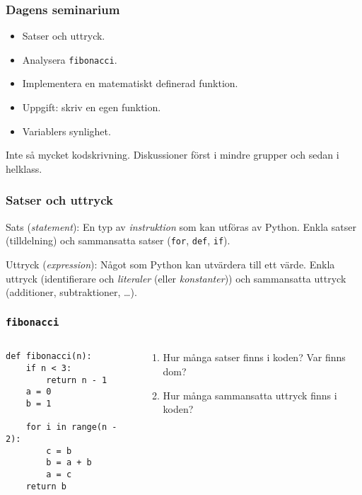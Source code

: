 \documentclass{beamer}
\begin{document}
  \begin{frame}
    \frametitle{Dagens seminarium}

    \begin{itemize}
      \item Satser och uttryck.
      \item Analysera \texttt{fibonacci}.
      \item Implementera en matematiskt definerad funktion.
      \item Uppgift: skriv en egen funktion.
      \item Variablers synlighet.
    \end{itemize}

    Inte så mycket kodskrivning. Diskussioner först i mindre grupper och sedan i
    helklass.

  \end{frame}

  \begin{frame}
    \frametitle{Satser och uttryck}

    Sats (\textit{statement}): En typ av \emph{instruktion} som kan utföras av
    Python. Enkla satser (tilldelning) och sammansatta satser (\texttt{for},
    \texttt{def}, \texttt{if}).

    Uttryck (\textit{expression}): Något som Python kan utvärdera till ett
    värde. Enkla uttryck (identifierare och \textit{literaler} (eller
    \textit{konstanter})) och sammansatta uttryck (additioner, subtraktioner,
    \dots).

  \end{frame}

  \begin{frame}[fragile]
    \frametitle{\texttt{fibonacci}}

    \begin{columns}
      \begin{column}{0.48\textwidth}
        \begin{verbatim}
def fibonacci(n):
    if n < 3:
        return n - 1
    a = 0
    b = 1

    for i in range(n - 2):
        c = b
        b = a + b
        a = c
    return b
        \end{verbatim}
      \end{column}%
      \begin{column}{0.48\textwidth}
        \begin{enumerate}
          \item Hur många satser finns i koden? Var finns dom?
          \item Hur många sammansatta uttryck finns i koden?
        \end{enumerate}
      \end{column}%
    \end{columns}
  \end{frame}
\end{document}

